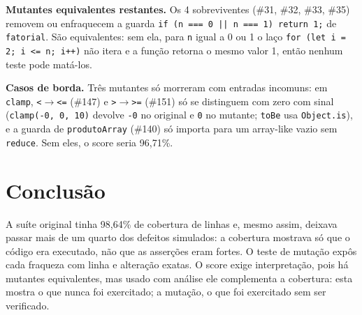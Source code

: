 \documentclass[12pt,oneside,a4paper,article,english,brazil]{abntex2}
\begin{document}

\textbf{Mutantes equivalentes restantes.} Os 4 sobreviventes (\#31, \#32, \#33,
\#35) removem ou enfraquecem a guarda \texttt{if (n === 0 || n === 1) return 1;}
de \texttt{fatorial}. São equivalentes: sem ela, para \texttt{n} igual a 0 ou 1
o laço \texttt{for (let i = 2; i <= n; i++)} não itera e a função retorna o
mesmo valor 1, então nenhum teste pode matá-los.

\textbf{Casos de borda.} Três mutantes só morreram com entradas incomuns:
em \texttt{clamp}, \texttt{<}$\to$\texttt{<=} (\#147) e \texttt{>}$\to$\texttt{>=}
(\#151) só se distinguem com zero com sinal (\texttt{clamp(-0, 0, 10)} devolve
\texttt{-0} no original e \texttt{0} no mutante; \texttt{toBe} usa
\texttt{Object.is}), e a guarda de \texttt{produtoArray} (\#140) só importa para
um array-like vazio sem \texttt{reduce}. Sem eles, o score seria 96,71\%.

\section{Conclusão}

A suíte original tinha 98,64\% de cobertura de linhas e, mesmo assim, deixava
passar mais de um quarto dos defeitos simulados: a cobertura mostrava só que o
código era executado, não que as asserções eram fortes. O teste de mutação
expôs cada fraqueza com linha e alteração exatas. O score exige interpretação,
pois há mutantes equivalentes, mas usado com análise ele complementa a
cobertura: esta mostra o que nunca foi exercitado; a mutação, o que foi
exercitado sem ser verificado.

\postextual

\end{document}
